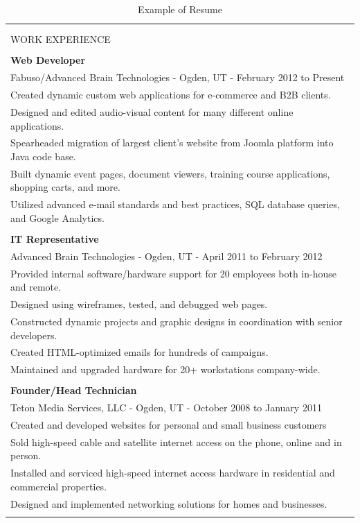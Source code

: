 \begin{table}[!p]
 \small
\caption{Example of Resume} %
\centering %
\begin{tabular}{    |  p{15cm} |  }
\hline
\begin{center}\normalsize{\textbf {Ryan Richman}}\\
\end{center}
\\
WORK EXPERIENCE\\
\\
\textbf{Web Developer}\\
Fabuso/Advanced Brain Technologies - Ogden, UT - February 2012 to Present \\
Created dynamic custom web applications for e-commerce and B2B clients. \\
Designed and edited audio-visual content for many different online applications. \\
Spearheaded migration of largest client's website from Joomla platform into Java code base. \\
Built dynamic event pages, document viewers, training course applications, shopping carts, and more. \\
Utilized advanced e-mail standards and best practices, SQL database queries, and Google Analytics.\\
\\
\textbf{IT Representative}\\
Advanced Brain Technologies - Ogden, UT - April 2011 to February 2012 \\
Provided internal software/hardware support for 20 employees both in-house and remote. \\
Designed using wireframes, tested, and debugged web pages. \\
Constructed dynamic projects and graphic designs in coordination with senior developers. \\
Created HTML-optimized emails for hundreds of campaigns. \\
Maintained and upgraded hardware for 20+ workstations company-wide. \\
\\
\textbf{Founder/Head Technician}\\
Teton Media Services, LLC - Ogden, UT - October 2008 to January 2011 \\
Created and developed websites for personal and small business customers \\
Sold high-speed cable and satellite internet access on the phone, online and in person. \\
Installed and serviced high-speed internet access hardware in residential and commercial properties. \\
Designed and implemented networking solutions for homes and businesses. \\
\\
 

\end{tabular}
\end{table}
